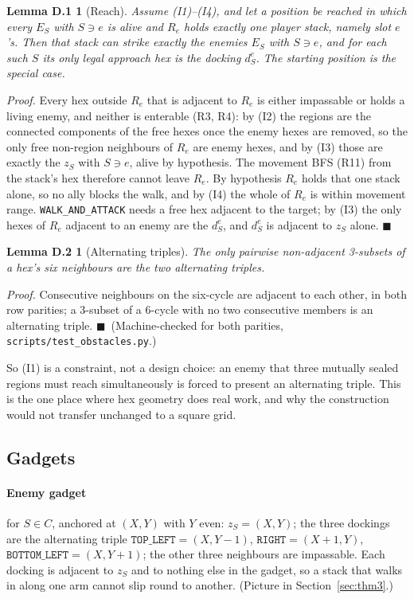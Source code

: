 \documentclass[11pt,a4paper]{article}
\theoremstyle{plain}
\newtheorem*{lemreach}{Lemma D.1}
\newtheorem*{lemalt}{Lemma D.2}
\theoremstyle{definition}
\theoremstyle{plain}
\theoremstyle{definition}
\theoremstyle{remark}
\newcommand{\src}[1]{\texttt{#1}}
\newcommand{\qedbox}{\hfill$\blacksquare$}
\begin{document}
\begin{lemreach}[Reach]
Assume (I1)--(I4), and let a position be reached in which every $E_S$ with $S\ni e$ is alive and
$R_e$ holds exactly one player stack, namely slot $e$'s. Then that stack can strike exactly the
enemies $E_S$ with $S\ni e$, and for each such $S$ its only legal approach hex is the docking
$d_S^e$. The starting position is the special case.
\end{lemreach}

\noindent\emph{Proof.} Every hex outside $R_e$ that is adjacent to $R_e$ is either impassable or
holds a living enemy, and neither is enterable (R3, R4): by (I2) the regions are the connected
components of the free hexes once the enemy hexes are removed, so the only free non-region
neighbours of $R_e$ are enemy hexes, and by (I3) those are exactly the $z_S$ with $S\ni e$, alive
by hypothesis. The movement BFS (R11) from the stack's hex therefore cannot leave
$R_e$. By hypothesis $R_e$ holds that one stack alone, so no ally blocks the walk, and
by (I4) the whole of $R_e$ is within movement range. \texttt{WALK\_AND\_ATTACK} needs a free hex
adjacent to the target; by (I3) the only hexes of $R_e$ adjacent to an enemy are the $d_S^e$, and
$d_S^e$ is adjacent to $z_S$ alone. \qedbox

\begin{lemalt}[Alternating triples]
The only pairwise non-adjacent 3-subsets of a hex's six neighbours are the two alternating
triples.
\end{lemalt}

\noindent\emph{Proof.} Consecutive neighbours on the six-cycle are adjacent to each other, in
both row parities; a 3-subset of a 6-cycle with no two consecutive members is an alternating
triple. \qedbox\ (Machine-checked for both parities, \src{scripts/test\_obstacles.py}.)

\smallskip
So (I1) is a constraint, not a design choice: an enemy that three mutually sealed regions must
reach simultaneously is forced to present an alternating triple. This is the one place where hex
geometry does real work, and why the construction would not transfer unchanged to a square grid.

\subsection{Gadgets}

\paragraph{Enemy gadget} for $S\in C$, anchored at $(X,Y)$ with $Y$ even: $z_S=(X,Y)$; the three
dockings are the alternating triple $\texttt{TOP\_LEFT}=(X,Y-1)$, $\texttt{RIGHT}=(X+1,Y)$,
$\texttt{BOTTOM\_LEFT}=(X,Y+1)$; the other three neighbours are impassable. Each docking is
adjacent to $z_S$ and to nothing else in the gadget, so a stack that walks in along one arm
cannot slip round to another. (Picture in Section~\ref{sec:thm3}.)
\end{document}
